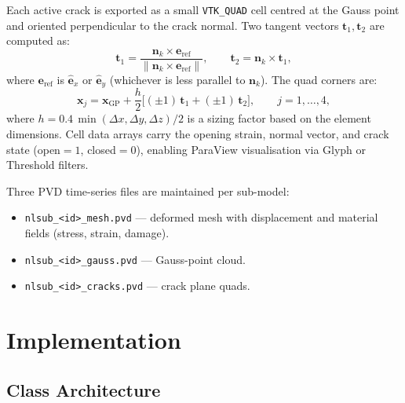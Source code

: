 Each active crack is exported as a small \texttt{VTK\_QUAD} cell
centred at the Gauss point and oriented perpendicular to the
crack normal.  Two tangent vectors $\mathbf{t}_1, \mathbf{t}_2$ are
computed as:
\begin{equation}
  \mathbf{t}_1 = \frac{\mathbf{n}_k \times \mathbf{e}_{\mathrm{ref}}}
                      {\|\mathbf{n}_k \times \mathbf{e}_{\mathrm{ref}}\|},
  \qquad
  \mathbf{t}_2 = \mathbf{n}_k \times \mathbf{t}_1,
  \label{eq:nlevo-crack-tangents}
\end{equation}
where $\mathbf{e}_{\mathrm{ref}}$ is $\hat{\mathbf{e}}_x$ or
$\hat{\mathbf{e}}_y$ (whichever is less parallel to $\mathbf{n}_k$).
The quad corners are:
\begin{equation}
  \mathbf{x}_j = \mathbf{x}_{\mathrm{GP}}
  + \frac{h}{2}
    \bigl[(\pm 1)\,\mathbf{t}_1 + (\pm 1)\,\mathbf{t}_2\bigr],
  \qquad j = 1,\ldots,4,
  \label{eq:nlevo-crack-quad}
\end{equation}
where $h = 0.4\,\min(\Delta x, \Delta y, \Delta z)/2$ is a sizing
factor based on the element dimensions.  Cell data arrays carry the
opening strain, normal vector, and crack state (open${}=1$,
closed${}=0$), enabling ParaView visualisation via Glyph or Threshold
filters.

Three PVD time-series files are maintained per sub-model:
\begin{itemize}
  \item \texttt{nlsub\_<id>\_mesh.pvd} --- deformed mesh with
        displacement and material fields (stress, strain, damage).
  \item \texttt{nlsub\_<id>\_gauss.pvd} --- Gauss-point cloud.
  \item \texttt{nlsub\_<id>\_cracks.pvd} --- crack plane quads.
\end{itemize}


\section{Implementation}
\label{sec:nlevo-implementation}

\subsection{Class Architecture}
\label{ssec:nlevo-class}

